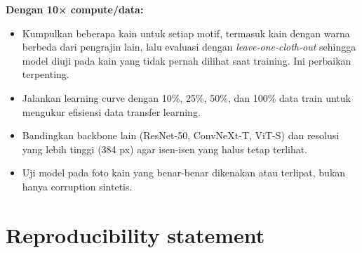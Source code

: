 \documentclass[10pt,a4paper]{article}
\providecommand{\tightlist}{\setlength{\itemsep}{2pt}\setlength{\parskip}{0pt}}
\begin{document}
\textbf{Dengan 10× compute/data:}

\begin{itemize}
\tightlist
\item
  Kumpulkan beberapa kain untuk setiap motif, termasuk kain dengan warna berbeda dari pengrajin lain, lalu evaluasi dengan \emph{leave-one-cloth-out} sehingga model diuji pada kain yang tidak pernah dilihat saat training. Ini perbaikan terpenting.
\item
  Jalankan learning curve dengan 10\%, 25\%, 50\%, dan 100\% data train untuk mengukur efisiensi data transfer learning.
\item
  Bandingkan backbone lain (ResNet-50, ConvNeXt-T, ViT-S) dan resolusi yang lebih tinggi (384 px) agar isen-isen yang halus tetap terlihat.
\item
  Uji model pada foto kain yang benar-benar dikenakan atau terlipat, bukan hanya corruption sintetis.
\end{itemize}

\section{Reproducibility statement}\label{reproducibility-statement}
\end{document}
